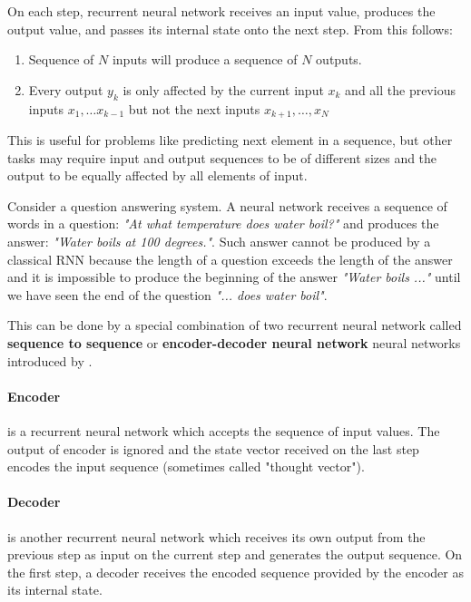 On each step, recurrent neural network receives an input value, produces the output value, and passes its internal state onto the next step. From this follows:

\begin{enumerate}
    \item Sequence of $N$ inputs will produce a sequence of $N$ outputs.
    \item Every output $y_k$ is only affected by the current input $x_k$ and all the previous inputs $x_1, \dots x_{k-1}$ but not the next inputs $x_{k+1}, \dots, x_N$
\end{enumerate}

This is useful for problems like predicting next element in a sequence, but other tasks may require input and output sequences to be of different sizes and the output to be equally affected by all elements of input.

Consider a question answering system. A neural network receives a sequence of words in a question: \textit{"At what temperature does water boil?"} and produces the answer: \textit{"Water boils at 100 degrees."}. Such answer cannot be produced by a classical RNN because the length of a question exceeds the length of the answer and it is impossible to produce the beginning of the answer \textit{"Water boils ..."} until we have seen the end of the question \textit{"... does water boil"}.

This can be done by a special combination of two recurrent neural network called \textbf{sequence to sequence} or \textbf{encoder-decoder neural network} neural networks introduced by \cite{Suts14}.

\paragraph{Encoder} is a recurrent neural network which accepts the sequence of input values. The output of encoder is ignored and the state vector received on the last step encodes the input sequence (sometimes called "thought vector").

\paragraph{Decoder} is another recurrent neural network which receives its own output from the previous step as input on the current step and generates the output sequence. On the first step, a decoder receives the encoded sequence provided by the encoder as its internal state.

